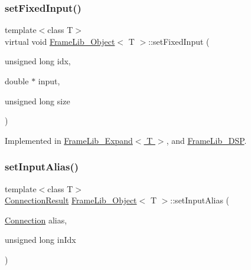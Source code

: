 \subsubsection{\texorpdfstring{set\+Fixed\+Input()}{setFixedInput()}}
{\footnotesize\ttfamily template$<$class T$>$ \\
virtual void \hyperlink{class_frame_lib___object}{Frame\+Lib\+\_\+\+Object}$<$ T $>$\+::set\+Fixed\+Input (\begin{DoxyParamCaption}\item[{unsigned long}]{idx,  }\item[{double $\ast$}]{input,  }\item[{unsigned long}]{size }\end{DoxyParamCaption})\hspace{0.3cm}{\ttfamily [pure virtual]}}



Implemented in \hyperlink{class_frame_lib___expand_ae7e72800c3b52698383e333885921ce4}{Frame\+Lib\+\_\+\+Expand$<$ T $>$}, and \hyperlink{class_frame_lib___d_s_p_a426afa0cf5d8f5c625619da2ccbf9be4}{Frame\+Lib\+\_\+\+D\+SP}.

\mbox{\label{class_frame_lib___object_a7a1b43b3eda170fbf298b2dfe94f9aa3}} 
\subsubsection{\texorpdfstring{set\+Input\+Alias()}{setInputAlias()}}
{\footnotesize\ttfamily template$<$class T$>$ \\
\hyperlink{_frame_lib___types_8h_a2a427ca8c6f961bac8e41f6edecf0722}{Connection\+Result} \hyperlink{class_frame_lib___object}{Frame\+Lib\+\_\+\+Object}$<$ T $>$\+::set\+Input\+Alias (\begin{DoxyParamCaption}\item[{\hyperlink{struct_frame_lib___object_1_1_connection}{Connection}}]{alias,  }\item[{unsigned long}]{in\+Idx }\end{DoxyParamCaption})\hspace{0.3cm}{\ttfamily [inline]}}

\mbox{\label{class_frame_lib___object_a5c34227ace795af7da847fff3f2b300d}} 
